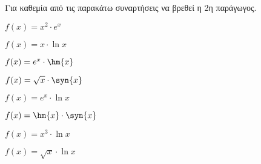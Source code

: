 Για καθεμία από τις παρακάτω συναρτήσεις να βρεθεί η 2η παράγωγος.
\begin{multicols}{2}
\begin{alist}
\item $ f(x)=x^2\cdot e^x $
\item $ f(x)=x\cdot\ln{x} $
\item $ f(x)=e^x\cdot\hm{x} $
\item $ f(x)=\sqrt{x}\cdot\syn{x} $
\item $ f(x)=e^x\cdot\ln{x} $
\item $ f(x)=\hm{x}\cdot\syn{x} $
\item $ f(x)=x^3\cdot\ln{x} $
\item $ f(x)=\sqrt{x}\cdot\ln{x} $
\end{alist}
\end{multicols}
